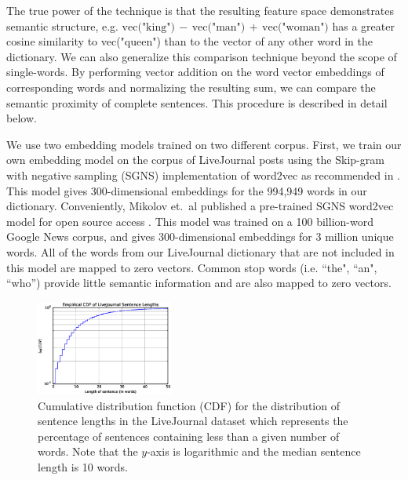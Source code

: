 \documentclass{sigchi}
\begin{document}
The true power of the technique is that the resulting feature space demonstrates semantic structure, e.g. $\text{vec("king")}\,{-}\, \text{vec("man")}\,{+}\,\text{vec("woman")}$ has a greater cosine similarity to vec("queen") than to the vector of any other word in the dictionary. We can also generalize this comparison technique beyond the scope of single-words. By performing vector addition on the word vector embeddings of corresponding words and normalizing the resulting sum, we can compare the semantic proximity of complete sentences. This procedure is described in detail below.

We use two embedding models trained on two different corpus. First, we train our own embedding model on the corpus of LiveJournal posts using the Skip-gram with negative sampling (SGNS) implementation of word2vec as recommended in \cite{MikolovSCCD13}. This model gives 300-dimensional embeddings for the 994,949 words in our dictionary. Conveniently, Mikolov et.~al published a pre-trained SGNS word2vec model for open source access \cite{word2vecWEB}. This model was trained on a 100 billion-word Google News corpus, and gives 300-dimensional embeddings for 3 million unique words. All of the words from our LiveJournal dictionary that are not included in this model are mapped to zero vectors. Common stop words (i.e. ``the", ``an", ``who'') provide little semantic information and are also mapped to zero vectors.


\begin{figure}[tb]
\centering \includegraphics[width=0.4\textwidth]{figures/wordCDF} 
\caption{Cumulative distribution function (CDF) for the distribution of sentence lengths in the LiveJournal dataset which represents the percentage of sentences containing less than a given number of words. Note that the $y$-axis is logarithmic and the median sentence length is 10 words. \label{fig:wordCDF}}
\end{figure}
\end{document}
